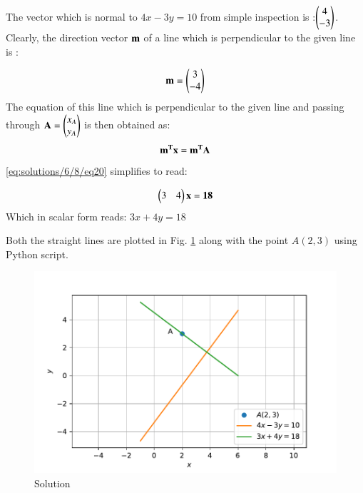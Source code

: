 The vector which is normal to $4x-3y=10$ from simple inspection is :$\begin{pmatrix}4\\-3\end{pmatrix}$. Clearly, the  direction vector $\bf{m}$ of a line which is perpendicular to the given line is :

\begin{equation}
\bf{m}=\begin{pmatrix}3\\-4\end{pmatrix}
\label{eq:solutions/6/8/eq10}
\end{equation}
The equation of this line which is perpendicular to the given line and  passing through $\bf{A}=\begin{pmatrix}x_A\\y_A\end{pmatrix}$ is then obtained as:
\begin{equation}
  {\bf{m^Tx}}=\bf{m^TA}
    \label{eq:solutions/6/8/eq20}
\end{equation}
\eqref{eq:solutions/6/8/eq20} simplifies to read:

\begin{equation}
 \begin{pmatrix}3 &4 \\\end{pmatrix}\bf{x}=18 
    \label{eq:solutions/6/8/eq30}
\end{equation}
Which in scalar form reads: $3x+4y=18$
        
Both the straight lines are plotted in Fig. \ref{eq:solutions/6/8/ExVIprob8.pdf} along with the point $A(2,3)$ using Python script.      
        
\begin{figure}[ht]
    \centering
    \includegraphics[width=\columnwidth]{./solutions/6/8/ExVIprob8.pdf}
    \caption{Solution}
    \label{eq:solutions/6/8/ExVIprob8.pdf}
\end{figure}



